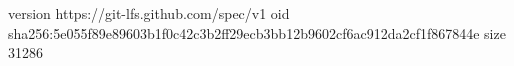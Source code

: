 version https://git-lfs.github.com/spec/v1
oid sha256:5e055f89e89603b1f0c42c3b2ff29ecb3bb12b9602cf6ac912da2cf1f867844e
size 31286
